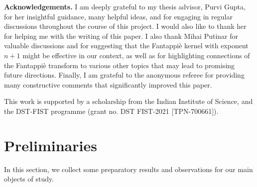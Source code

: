 \documentclass[11pt, oneside, reqno]{amsart}
\numberwithin{equation}{section}
\theoremstyle{definition}
\begin{document}
{\noindent \textbf{Acknowledgements.} I am deeply grateful to my thesis advisor, Purvi Gupta, for her insightful guidance, many helpful ideas, and for engaging in regular discussions throughout the course of this project. I would also like to thank her for helping me with the writing of this paper. I also thank Mihai Putinar for valuable discussions and for suggesting that the Fantappi{\`e} kernel with exponent $n+1$ might be effective in our context, as well as for highlighting connections of the Fantappi{\`e} transform to various other topics that may lead to promising future directions. Finally, I am grateful to the anonymous referee for providing many constructive comments that significantly improved this paper.

This work is supported by a scholarship from the Indian Institute of Science, and the DST-FIST
programme (grant no. DST FIST-2021 [TPN-700661]).



\section{Preliminaries}
In this section, we collect some preparatory results and observations for our main objects of study. 
}
\end{document}
